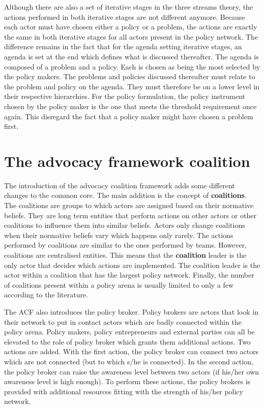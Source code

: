 Although there are also a set of iterative stages in the three streams theory, the actions performed in both iterative stages are not different anymore. Because each actor must have chosen either a policy or a problem, the actions are exactly the same in both iterative stages for all actors present in the policy network. The difference remains in the fact that for the agenda setting iterative stages, an agenda is set at the end which defines what is discussed thereafter. The agenda is composed of a problem and a policy. Each is chosen as being the most selected by the policy makers. The problems and policies discussed thereafter must relate to the problem and policy on the agenda. They must therefore be on a lower level in their respective hierarchies. For the policy formulation, the policy instrument chosen by the policy maker is the one that meets the threshold requirement once again. This disregard the fact that a policy maker might have chosen a problem first.

\section{The advocacy framework coalition}
\label{sec:conceptualisationACFRevised}

The introduction of the advocacy coalition framework adds some different changes to the common core. The main addition is the concept of {\bfseries coalitions}. The coalitions are groups to which actors are assigned based on their normative beliefs. They are long term entities that perform actions on other actors or other coalitions to influence them into similar beliefs. Actors only change coalitions when their normative beliefs vary which happens only rarely. The actions performed by coalitions are similar to the ones performed by teams. However, coalitions are centralised entities. This means that the {\bfseries coalition} leader is the only actor that decides which actions are implemented. The coalition leader is the actor within a coalition that has the largest policy network. Finally, the number of coalitions present within a policy arena is usually limited to only a few according to the literature. 

The ACF also introduces the policy broker. Policy brokers are actors that look in their network to put in contact actors which are badly connected within the policy arena. Policy makers, policy entrepreneurs and external parties can all be elevated to the role of policy broker which grants them additional actions. Two actions are added. With the first action, the policy broker can connect two actors which are not connected (but to which s/he is connected). In the second action, the policy broker can raise the awareness level between two actors (if his/her own awareness level is high enough). To perform these actions, the policy brokers is provided with additional resources fitting with the strength of his/her policy network.

